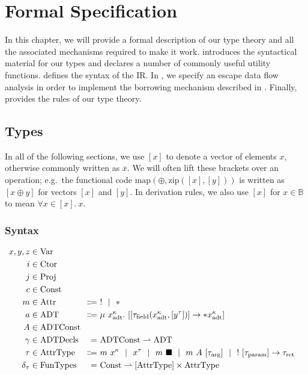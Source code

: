 \chapter{Formal Specification}\label{sec:theory}
In this chapter, we will provide a formal description of our type theory and all the associated mechanisms required to make it work.  introduces the syntactical material for our types and declares a number of commonly useful utility functions.  defines the syntax of the IR. In , we specify an escape data flow analysis in order to implement the borrowing mechanism described in . Finally,  provides the rules of our type theory.

\section{Types}\label{sec:types}
In all of the following sections, we use $[x]$ to denote a vector of elements $x$, otherwise commonly written as $\overline{x}$. We will often lift these brackets over an operation; e.g.\ the functional code $\mathrm{map}(\oplus, \mathrm{zip}([x], [y]))$ is written as $[x \oplus y]$ for vectors $[x]$ and $[y]$. In derivation rules, we also use $[x]$ for $x \in \mathbb{B}$ to mean $\forall x \in [x].\ x$.

\subsection{Syntax}
\newcommand{\dom}{\mathrm{dom}}
\newcommand{\Attr}{\mathrm{Attr}}
\newcommand{\ADT}{\mathrm{ADT}}
\newcommand{\adt}{\mathrm{adt}}
\newcommand{\field}{\mathrm{field}}
\newcommand{\ADTConst}{\mathrm{ADTConst}}
\newcommand{\AttrType}{\mathrm{AttrType}}
\newcommand{\arrg}{\mathrm{arg}}
\newcommand{\param}{\mathrm{param}}
\newcommand{\ret}{\mathrm{ret}}
\newcommand{\ADTDecls}{\mathrm{ADTDecls}}
\newcommand{\FunTypes}{\mathrm{FunTypes}}
\begin{alignat*}{2}
  x, y, z &\in \Var \\
  i &\in \Ctor \\
  j &\in \Proj \\
  c &\in \Const \\
  m &\in \Attr &\Coloneqq&\ ! \sep * \\
  a &\in \ADT &\Coloneqq&\ \mu\ x^\kappa_\adt.\ [[\tau_\field(x^\kappa_\adt, [y^\tau])] \to *x^\kappa_\adt] \\
  A &\in \mathrlap{\ADTConst} \\
  \gamma &\in \ADTDecls &=&\ \ADTConst \rightharpoonup \ADT \\
  \tau &\in \AttrType &\Coloneqq&\ m\ x^\kappa \sep x^\tau \sep m\ \blacksquare \sep m\ A\ [\tau_\arrg] \sep !\ [\tau_\param] \to \tau_\ret \\
  \delta_\tau &\in \FunTypes &=&\ \Const \rightharpoonup [\AttrType] \times \AttrType
\end{alignat*}


